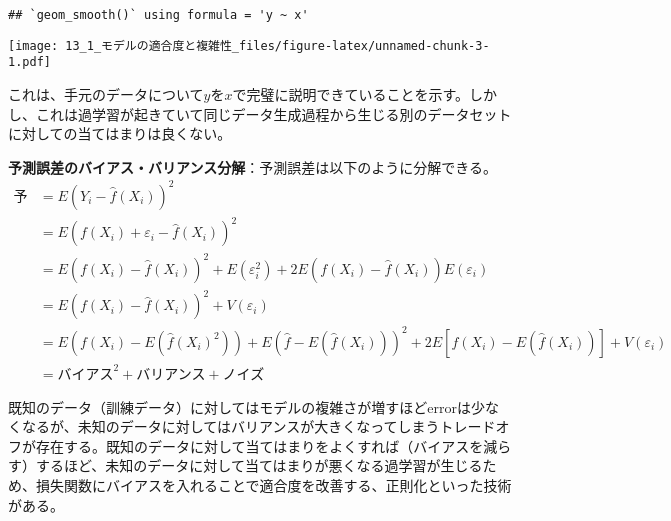 \documentclass[
  pandoc,
  jafont=haranoaji]{bxjsarticle}
\newenvironment{Shaded}{\begin{snugshade}}{\end{snugshade}}
\newcommand{\AttributeTok}[1]{\textcolor[rgb]{0.13,0.29,0.53}{#1}}
\newcommand{\CommentTok}[1]{\textcolor[rgb]{0.56,0.35,0.01}{\textit{#1}}}
\newcommand{\DecValTok}[1]{\textcolor[rgb]{0.00,0.00,0.81}{#1}}
\newcommand{\FunctionTok}[1]{\textcolor[rgb]{0.13,0.29,0.53}{\textbf{#1}}}
\newcommand{\NormalTok}[1]{#1}
\newcommand{\OtherTok}[1]{\textcolor[rgb]{0.56,0.35,0.01}{#1}}
\newcommand{\SpecialCharTok}[1]{\textcolor[rgb]{0.81,0.36,0.00}{\textbf{#1}}}
\newcommand{\StringTok}[1]{\textcolor[rgb]{0.31,0.60,0.02}{#1}}
\begin{document}
\begin{Shaded}
\end{Shaded}

\begin{verbatim}
## `geom_smooth()` using formula = 'y ~ x'
\end{verbatim}

\texttt{[image: 13\_1\_モデルの適合度と複雑性\_files/figure-latex/unnamed-chunk-3-1.pdf]}

これは、手元のデータについて\(y\)を\(x\)で完璧に説明できていることを示す。しかし、これは過学習が起きていて同じデータ生成過程から生じる別のデータセットに対しての当てはまりは良くない。

\textbf{予測誤差のバイアス・バリアンス分解}：予測誤差は以下のように分解できる。
\[
\begin{align}
\text{予測誤差}　&= E(Y_i-\hat{f}(X_i))^2\\
&= E(f(X_i)+\varepsilon_i -\hat{f}(X_i) )^2\\
&= E(f(X_i)- \hat{f}(X_i))^2 + E(\varepsilon_i^2) + 2E(f(X_i)- \hat{f}(X_i))E(\varepsilon_i)\\
&= E(f(X_i)- \hat{f}(X_i))^2 + V(\varepsilon_i)\\
&= E(f(X_i)-E(\hat{f}(X_i)^2)) + E(\hat{f}-E(\hat{f}(X_i)))^2 + 2E[f(X_i)-E(\hat{f}(X_i))] +V(\varepsilon_i)\\
&= \text{バイアス}^2 + \text{バリアンス} + \text{ノイズ}
\end{align}
\]

既知のデータ（訓練データ）に対してはモデルの複雑さが増すほどerrorは少なくなるが、未知のデータに対してはバリアンスが大きくなってしまうトレードオフが存在する。既知のデータに対して当てはまりをよくすれば（バイアスを減らす）するほど、未知のデータに対して当てはまりが悪くなる過学習が生じるため、損失関数にバイアスを入れることで適合度を改善する、正則化といった技術がある。
\end{document}
